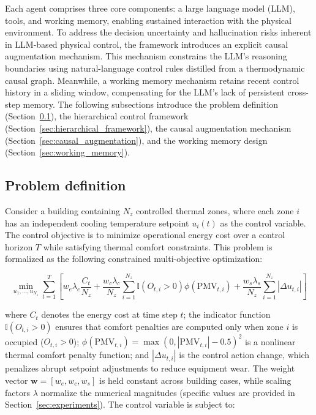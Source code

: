 \documentclass[a4paper]{cas-sc}
\begin{document}
Each agent comprises three core components: a large language model (LLM), tools, and working memory, enabling sustained interaction with the physical environment. To address the decision uncertainty and hallucination risks inherent in LLM-based physical control, the framework introduces an explicit causal augmentation mechanism. This mechanism constrains the LLM's reasoning boundaries using natural-language control rules distilled from a thermodynamic causal graph. Meanwhile, a working memory mechanism retains recent control history in a sliding window, compensating for the LLM's lack of persistent cross-step memory. The following subsections introduce the problem definition (Section~\ref{sec:problem_definition}), the hierarchical control framework (Section~\ref{sec:hierarchical_framework}), the causal augmentation mechanism (Section~\ref{sec:causal_augmentation}), and the working memory design (Section~\ref{sec:working_memory}).

\subsection{Problem definition}
\label{sec:problem_definition}

Consider a building containing $N_z$ controlled thermal zones, where each zone $i$ has an independent cooling temperature setpoint $u_i(t)$ as the control variable. The control objective is to minimize operational energy cost over a control horizon $T$ while satisfying thermal comfort constraints. This problem is formalized as the following constrained multi-objective optimization:

\begin{equation}
\min_{u_1, \ldots, u_{N_z}} \sum_{t=1}^{T} \left[ w_e \lambda_e \frac{C_t}{N_z} + \frac{w_c \lambda_c}{N_z} \sum_{i=1}^{N_z}\mathbb{I}(O_{t,i} > 0) \phi(\text{PMV}_{t,i}) + \frac{w_s \lambda_s}{N_z} \sum_{i=1}^{N_z} |\Delta u_{t,i}| \right]
\label{eq:objective}
\end{equation}

\noindent where $C_t$ denotes the energy cost at time step $t$; the indicator function $\mathbb{I}(O_{t,i} > 0)$ ensures that comfort penalties are computed only when zone $i$ is occupied ($O_{t,i} > 0$); $\phi(\text{PMV}_{t,i}) = \max(0, |\text{PMV}_{t,i}| - 0.5)^2$ is a nonlinear thermal comfort penalty function; and $|\Delta u_{t,i}|$ is the control action change, which penalizes abrupt setpoint adjustments to reduce equipment wear. The weight vector $\mathbf{w} = [w_e, w_c, w_s]$ is held constant across building cases, while scaling factors $\lambda$ normalize the numerical magnitudes (specific values are provided in Section~\ref{sec:experiments}). The control variable is subject to:
\end{document}
